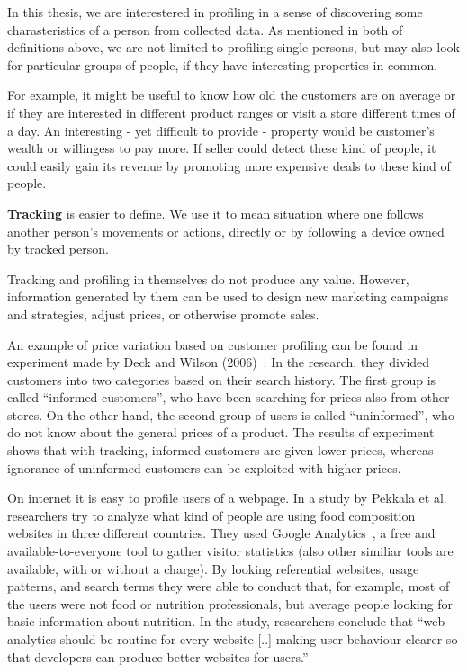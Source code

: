 \documentclass[12pt,a4paper,oneside,pdftex]{report}
\begin{document}
In this thesis, we are interestered in profiling in a sense of discovering some charasteristics of a person from collected data. As mentioned in both of definitions above, we are not limited to profiling single persons, but may also look for particular groups of people, if they have interesting properties in common.

For example, it might be useful to know how old the customers are on average or if they are interested in different product ranges or visit a store different times of a day. An interesting - yet difficult to provide - property would be customer's wealth or willingess to pay more. If seller could detect these kind of people, it could easily gain its revenue by promoting more expensive deals to these kind of people.

\textbf{Tracking} is easier to define. We use it to mean situation where one follows another person's movements or actions, directly or by following a device owned by tracked person. 

Tracking and profiling in themselves do not produce any value. However, information generated by them can be used to design new marketing campaigns and strategies, adjust prices, or otherwise promote sales.

An example of price variation based on customer profiling can be found in experiment made by Deck and Wilson (2006)~\cite{Deck2006}. In the research, they divided customers into two categories based on their search history. The first group is called ``informed customers'', who have been searching for prices also from other stores. On the other hand, the second group of users is called ``uninformed'', who do not know about the general prices of a product. The results of experiment shows that with tracking, informed customers are given lower prices, whereas ignorance of uninformed customers can be exploited with higher prices.

On internet it is easy to profile users of a webpage. In a study by Pekkala et al.~\cite{Pakkala2012504} researchers try to analyze what kind of people are using food composition websites in three different countries. They used Google Analytics~\cite{googleanalytics}, a free and available-to-everyone tool to gather visitor statistics (also other similiar tools are available, with or without a charge). By looking referential websites, usage patterns, and search terms they were able to conduct that, for example, most of the users were not food or nutrition professionals, but average people looking for basic information about nutrition. In the study, researchers conclude that ``web analytics should be routine for every website [..] making user behaviour clearer so that developers can produce better websites for users.''
\end{document}
